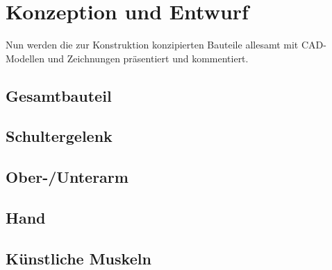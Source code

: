 \chapter{Konzeption und Entwurf}

	Nun werden die zur Konstruktion konzipierten Bauteile allesamt mit CAD-Modellen und Zeichnungen präsentiert und kommentiert.

\section{Gesamtbauteil}


\section{Schultergelenk}


\section{Ober-/Unterarm}


\section{Hand}


\section{Künstliche Muskeln}